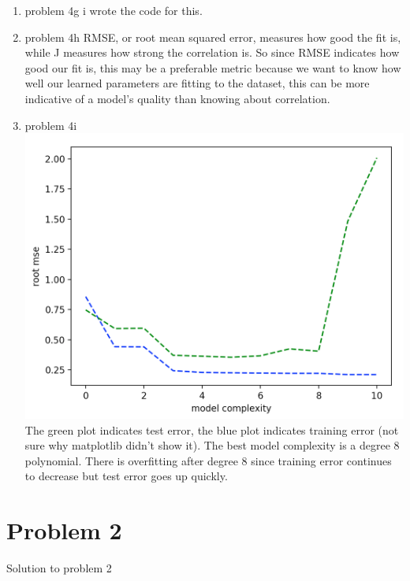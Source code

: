 \documentclass[11pt]{article}
\newcommand{\solution}[1]{{{\color{blue}{\bf Solution:} {#1}}}}
\begin{document}
\begin{enumerate}
\vspace{1cm}
\item problem 4g
\solution{i wrote the code for this.}

\vspace{1cm}
\item problem 4h
\solution{
RMSE, or root mean squared error, measures how good the fit is, while J measures how strong the correlation is. So since RMSE indicates how good our fit is, this may be a preferable metric because we want to know how well our learned parameters are fitting to the dataset, this can be more indicative of a model's quality than knowing about correlation.
}

\vspace{1cm}
\item problem 4i
\newline{}
\includegraphics[scale=0.5]{ps111.png}
\newline{}
The green plot indicates test error, the blue plot indicates training error (not sure why matplotlib didn't show it). The best model complexity is a degree 8 polynomial. There is overfitting after degree 8 since training error continues to decrease but test error goes up quickly. 
\end{enumerate}

\newpage
\section{Problem 2}

\solution{Solution to problem 2}
\newpage
\end{document}
